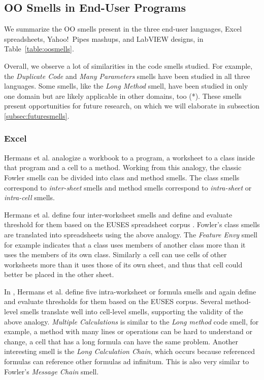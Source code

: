 \documentclass[10pt,conference,compsocconf]{IEEEtran}
\begin{document}
\subsection{OO Smells in End-User Programs}
\label{sec:smells:oo}
 We summarize the OO smells present in the three end-user languages, Excel spreadsheets, Yahoo!\ Pipes mashups, and LabVIEW designs, in Table~\ref{table:oosmells}.
 
 Overall, we observe a lot of similarities in the code smells studied. For example, the \emph{Duplicate Code} and \emph{Many Parameters} smells have been studied in all three languages. Some smells, like the \emph{Long Method} smell, have been studied in only one domain but are likely applicable in other domains, too (*). These smells present opportunities for future research, on which we will elaborate in subsection \ref{subsec:futuresmells}.
 

 \subsubsection{Excel}
Hermans et al. \cite{Hermans2012inter} \cite{Hermans2012intra} analogize a workbook to a program, a worksheet to a class inside that program and a cell to a method.
Working from this analogy, the classic Fowler smells can be divided into class and method smells.
The class smells correspond to \textit{inter-sheet} smells and method smells correspond to \textit{intra-sheet} or \textit{intra-cell} smells.

Hermans et al. \cite{Hermans2012inter} define four inter-worksheet smells and define and evaluate threshold for them based on the EUSES spreadsheet corpus \cite{fisher2005euses}.
Fowler's class smells are translated into spreadsheets using the above analogy. 
The \textit{Feature Envy} smell for example indicates that a class uses members of another class more than it uses the members of its own class.
Similarly a cell can use cells of other worksheets more than it uses those of its own sheet, and thus that cell could better be placed in the other sheet.

In \cite{Hermans2012intra}, Hermans et al. define five intra-worksheet or formula smells and again define and evaluate thresholds for them based on the EUSES corpus.
Several method-level smells translate well into cell-level smells, supporting the validity of the above analogy.
\textit{Multiple Calculations} is similar to the \textit{Long method} code smell, for example, a method with many lines or operations can be hard to understand or change, a cell that has a long formula can have the same problem.
Another interesting smell is the \textit{Long Calculation Chain}, which occurs because referenced formulas can reference other formulas ad infinitum.
This is also very similar to Fowler's \textit{Message Chain} smell.
\end{document}
